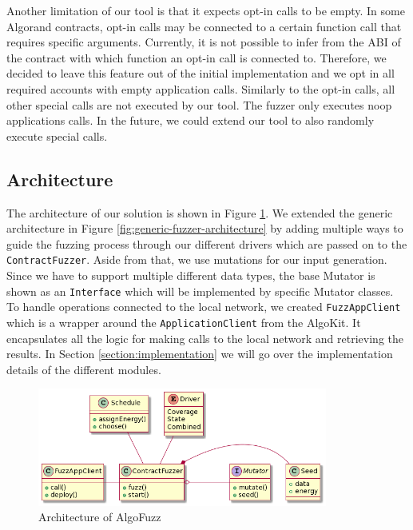 Another limitation of our tool is that it expects opt-in calls to be empty.
In some Algorand contracts, opt-in calls may be connected to a certain function call that requires specific arguments.
Currently, it is not possible to infer from the \ac{ABI} of the contract with which function an opt-in call is connected to.
Therefore, we decided to leave this feature out of the initial implementation and we opt in all required accounts with empty application calls.
Similarly to the opt-in calls, all other special calls are not executed by our tool.
The fuzzer only executes noop applications calls.
In the future, we could extend our tool to also randomly execute special calls.

\subsection*{Architecture}
The architecture of our solution is shown in Figure \ref{fig:algofuzz-architecture}.
We extended the generic architecture in Figure \ref{fig:generic-fuzzer-architecture} by adding multiple ways to guide the fuzzing process through our different drivers which are passed on to the \texttt{ContractFuzzer}.
Aside from that, we use mutations for our input generation. Since we have to support multiple different data types, the base Mutator is shown as an \texttt{Interface} which will be implemented by specific Mutator classes.
To handle operations connected to the local network, we created \texttt{FuzzAppClient} which is a wrapper around the \texttt{ApplicationClient} from the AlgoKit.
It encapsulates all the logic for making calls to the local network and retrieving the results.
In Section \ref{section:implementation} we will go over the implementation details of the different modules.

\begin{figure}[htbp]
    \centering
    \includegraphics[width=0.85\textwidth]{figures/arc.png}
    \caption{Architecture of AlgoFuzz}\label{fig:algofuzz-architecture}
\end{figure}

